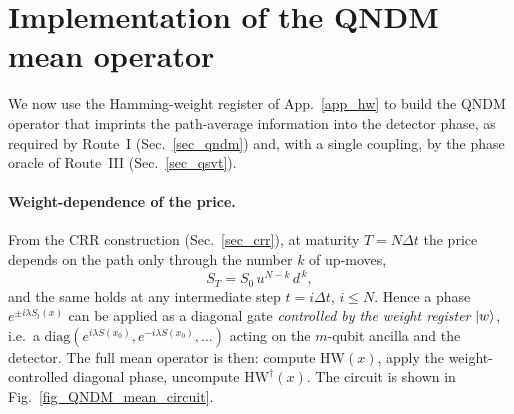 \documentclass[11pt]{article}
\newcommand{\deltat}{\Delta t}
\begin{document}
\section{Implementation of the QNDM mean operator}\label{app_qndm}

We now use the Hamming-weight register of App.~\ref{app_hw} to build the QNDM operator that imprints the path-average information into the detector phase, as required by Route~I (Sec.~\ref{sec_qndm}) and, with a single coupling, by the phase oracle of Route~III (Sec.~\ref{sec_qsvt}).

\paragraph{Weight-dependence of the price.} From the CRR construction (Sec.~\ref{sec_crr}), at maturity $T=N\deltat$ the price depends on the path only through the number $k$ of up-moves,
\begin{equation}\label{eq_S_weight}
S_T=S_0\,u^{N-k}\,d^{\,k},
\end{equation}
and the same holds at any intermediate step $t=i\deltat$, $i\le N$. Hence a phase $e^{\pm i\lambda S_t(x)}$ can be applied as a diagonal gate \emph{controlled by the weight register} $\ket{w}$, i.e.\ a $\mathrm{diag}(e^{i\lambda S(x_0)},e^{-i\lambda S(x_0)},\dots)$ acting on the $m$-qubit ancilla and the detector. The full mean operator is then: compute $\mathrm{HW}(x)$, apply the weight-controlled diagonal phase, uncompute $\mathrm{HW}^\dagger(x)$. The circuit is shown in Fig.~\ref{fig_QNDM_mean_circuit}.
\end{document}

